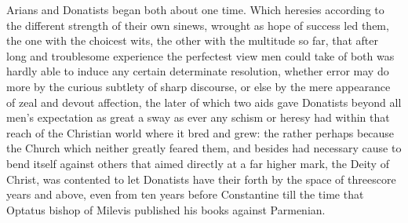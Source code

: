 Arians and Donatists began both about one time. Which heresies according to the different strength of their own sinews, wrought as hope of success led them, the one with the choicest wits, the other with the multitude so far, that after long and troublesome experience the perfectest view men could take of both was hardly able to induce any certain determinate resolution, whether error may do more by the curious subtlety of sharp discourse, or else by the mere appearance of zeal and devout affection, the later of which two aids gave Donatists beyond all men’s expectation as great a sway as ever any schism or heresy had within that reach of the Christian world where it bred and grew: the rather perhaps because the Church which neither greatly feared them, and besides had necessary cause to bend itself against others that aimed directly at a far higher mark, the Deity of Christ, was contented to let Donatists have their forth by the space of threescore years and above, even from ten years before Constantine till the time that Optatus bishop of Milevis published his books against Parmenian.
